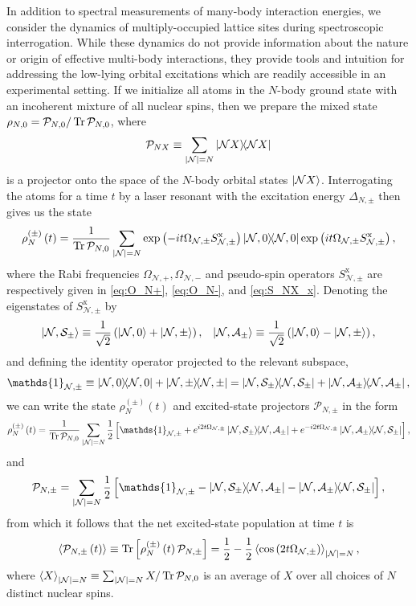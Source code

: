 \documentclass[preprint,showkeys,nofootinbib]{revtex4-1}
\newcommand{\f}{\dfrac} %
\newcommand{\p}[1]{\left(#1\right)} %
\renewcommand{\sp}[1]{\left[#1\right]} %
\newcommand{\bk}{\braket} %
\newcommand{\x}{\text{x}}
\newcommand{\A}{\mathcal{A}}
\newcommand{\N}{\mathcal{N}}
\renewcommand{\P}{\mathcal{P}}
\renewcommand{\S}{\mathcal{S}}
\newcommand{\1}{\mathds{1}}
\begin{document}
In addition to spectral measurements of many-body interaction
energies, we consider the dynamics of multiply-occupied lattice sites
during spectroscopic interrogation.  While these dynamics do not
provide information about the nature or origin of effective multi-body
interactions, they provide tools and intuition for addressing the
low-lying orbital excitations which are readily accessible in an
experimental setting.  If we initialize all atoms in the $N$-body
ground state with an incoherent mixture of all nuclear spins, then we
prepare the mixed state $\rho_{N,0}=\P_{N,0}/\Tr\P_{N,0}$, where
\begin{align}
  \P_{NX} \equiv \sum_{\abs{\N}=N}\op{\N X}
  \label{eq:P_NX}
\end{align}
is a projector onto the space of the $N$-body orbital states
$\ket{\N X}$.  Interrogating the atoms for a time $t$ by a laser
resonant with the excitation energy $\Delta_{N,\pm}$ then gives us the
state
\begin{align}
  \rho_N^{(\pm)}\p{t} = \f1{\Tr\P_{N,0}}
  \sum_{\abs{\N}=N} \exp\p{-it\Omega_{\N,\pm}S_{\N,\pm}^\x}
  \op{\N,0} \exp\p{it\Omega_{\N,\pm}S_{\N,\pm}^\x},
\end{align}
where the Rabi frequencies $\Omega_{\N,+},\Omega_{\N,-}$ and
pseudo-spin operators $S_{\N,\pm}^\x$ are respectively given in
\eqref{eq:O_N+}, \eqref{eq:O_N-}, and \eqref{eq:S_NX_x}.  Denoting the
eigenstates of $S_{\N,\pm}^\x$ by
\begin{align}
  \ket{\N,\S_\pm} \equiv \f1{\sqrt2} \p{\ket{\N,0} + \ket{\N,\pm}},
  &&
  \ket{\N,\A_\pm} \equiv \f1{\sqrt2} \p{\ket{\N,0} - \ket{\N,\pm}},
\end{align}
and defining the identity operator projected to the relevant subspace,
\begin{align}
  \1_{\N,\pm} \equiv \op{\N,0} + \op{\N,\pm}
  = \op{\N,\S_\pm} + \op{\N,\A_\pm},
\end{align}
we can write the state $\rho_N^{(\pm)}\p{t}$ and excited-state
projectors $\P_{N,\pm}$ in the form
\begin{align}
  \rho_N^{(\pm)}\p{t} = \f1{\Tr\P_{N,0}} \sum_{\abs{\N}=N} \f12
  \sp{\1_{\N,\pm} + e^{i2t\Omega_{\N,\pm}}\op{\N,\S_\pm}{\N,\A_\pm}
    + e^{-i2t\Omega_{\N,\pm}}\op{\N,\A_\pm}{\N,\S_\pm}},
  \label{eq:rho_N_pm_t}
\end{align}
and
\begin{align}
  \P_{N,\pm} = \sum_{\abs{\N}=N} \f12
  \sp{\1_{\N,\pm}-\op{\N,\S_\pm}{\N,\A_\pm}-\op{\N,\A_\pm}{\N,\S_\pm}},
\end{align}
from which it follows that the net excited-state population at time
$t$ is
\begin{align}
  \bk{\P_{N,\pm}\p{t}}
  \equiv \Tr\sp{\rho_N^{(\pm)}\p{t}\P_{N,\pm}}
  = \f12 - \f12 \bk{\cos\p{2t\Omega_{\N,\pm}}}_{\abs{\N}=N},
  \label{eq:P_N_pm_t}
\end{align}
where $\bk{X}_{\abs{\N}=N}\equiv\sum_{\abs{\N}=N}X/\Tr\P_{N,0}$ is an
average of $X$ over all choices of $N$ distinct nuclear spins.
\end{document}
